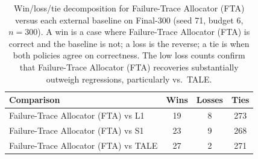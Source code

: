 \begin{table}[H]
\centering
\caption{Win/loss/tie decomposition for Failure-Trace Allocator (FTA) versus each external baseline on
Final-300 (seed 71, budget 6, $n=300$). A win is a case where Failure-Trace Allocator (FTA) is correct
and the baseline is not; a loss is the reverse; a tie is when both policies agree on
correctness. The low loss counts confirm that Failure-Trace Allocator (FTA) recoveries substantially
outweigh regressions, particularly vs.\ TALE.}
\label{tab:wlt}
\small
\begin{tabular}{lccc}
\toprule
Comparison & Wins & Losses & Ties \\
\midrule
Failure-Trace Allocator (FTA) vs L1   & 19 & 8 & 273 \\
Failure-Trace Allocator (FTA) vs S1   & 23 & 9 & 268 \\
Failure-Trace Allocator (FTA) vs TALE & 27 & 2 & 271 \\
\bottomrule
\end{tabular}
\end{table}
